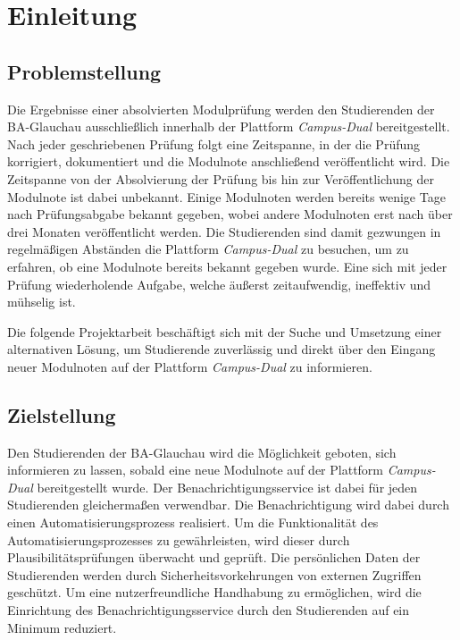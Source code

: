 \chapter{Einleitung}
\section{Problemstellung}
Die Ergebnisse einer absolvierten Modulprüfung werden den Studierenden der BA-Glauchau ausschließlich innerhalb der Plattform \textit{Campus-Dual} bereitgestellt.
Nach jeder geschriebenen Prüfung folgt eine Zeitspanne, in der die Prüfung korrigiert, dokumentiert und die Modulnote anschließend veröffentlicht wird.
Die Zeitspanne von der Absolvierung der Prüfung bis hin zur Veröffentlichung der Modulnote ist dabei unbekannt.
Einige Modulnoten werden bereits wenige Tage nach Prüfungsabgabe bekannt gegeben, wobei andere Modulnoten erst nach über drei Monaten veröffentlicht werden.
Die Studierenden sind damit gezwungen in regelmäßigen Abständen die Plattform \textit{Campus-Dual} zu besuchen, um zu erfahren, ob eine Modulnote bereits bekannt gegeben wurde.
Eine sich mit jeder Prüfung wiederholende Aufgabe, welche äußerst zeitaufwendig, ineffektiv und mühselig ist.

Die folgende Projektarbeit beschäftigt sich mit der Suche und Umsetzung einer alternativen Lösung, um Studierende zuverlässig und direkt über den Eingang neuer Modulnoten auf der Plattform \textit{Campus-Dual} zu informieren.

\section{Zielstellung}
Den Studierenden der BA-Glauchau wird die Möglichkeit geboten, sich informieren zu lassen, sobald eine neue Modulnote auf der Plattform \textit{Campus-Dual} bereitgestellt wurde.
Der Benachrichtigungsservice ist dabei für jeden Studierenden gleichermaßen verwendbar.
Die Benachrichtigung wird dabei durch einen Automatisierungsprozess realisiert.
Um die Funktionalität des Automatisierungsprozesses zu gewährleisten, wird dieser durch Plausibilitätsprüfungen überwacht und geprüft.
Die persönlichen Daten der Studierenden werden durch Sicherheitsvorkehrungen von externen Zugriffen geschützt.
Um eine nutzerfreundliche Handhabung zu ermöglichen, wird die Einrichtung des Benachrichtigungsservice durch den Studierenden auf ein Minimum reduziert.